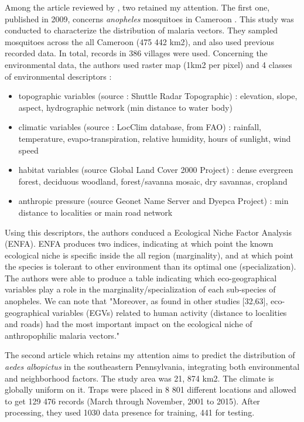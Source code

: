 \documentclass{article}
\begin{document}
Among the article reviewed by \cite{lippi_trends_2023}, two retained my attention. The first one, published in 2009, concerns \textit{anopheles} mosquitoes in Cameroon \cite{ayala_habitat_2009}. This study was conducted to characterize the distribution of malaria vectors. They sampled mosquitoes across the all Cameroon (475 442 km2), and also used previous recorded data. In total, records in 386 villages were used. Concerning the environmental data, the authors used raster map (1km2 per pixel) and 4 classes of environmental descriptors :
\begin{itemize}
\item topographic variables (source : Shuttle Radar Topographic) : elevation, slope, aspect, hydrographic network (min distance to water body)
\item climatic variables (source : LocClim database, from FAO) : rainfall, temperature, evapo-transpiration, relative humidity, hours of sunlight, wind speed
\item habitat variables (source Global Land Cover 2000 Project) : dense evergreen forest, deciduous woodland, forest/savanna mosaic, dry savannas, cropland
\item anthropic pressure (source Geonet Name Server and Dyepca Project) : min distance to localities or main road network
\end{itemize}
Using this descriptors, the authors conduced a Ecological Niche Factor Analysis (ENFA). ENFA produces two indices, indicating at which point the known ecological niche is specific inside the all region (marginality), and at which point the species is tolerant to other environment than its optimal one (specialization). The authors were able to produce a table indicating which eco-geographical variables play a role in the marginality/specialization of each sub-species of anopheles.
We can note that "Moreover, as found in other studies [32,63], eco-geographical variables (EGVs) related to human activity (distance to localities and roads) had the most important impact on the ecological niche of anthropophilic malaria vectors."

\par
The second article which retains my attention aims to predict the distribution of \textit{aedes albopictus} in the southeastern Pennsylvania, integrating both environmental and neighborhood factors. The study area was 21, 874 km2. The climate is globally uniform on it. Traps were placed in 8 801 different locations and allowed to get 129 476 records (March through November, 2001 to 2015). After processing, they used 1030 data presence for training, 441 for testing.
\end{document}

